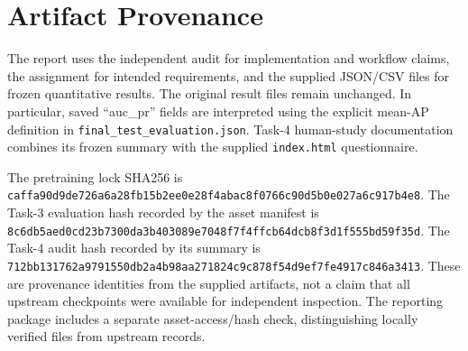 \documentclass[conference]{IEEEtran}
\begin{document}
\section{Artifact Provenance}\label{sec:provenance}
The report uses the independent audit for implementation and workflow claims, the assignment for intended requirements, and the supplied JSON/CSV files for frozen quantitative results. The original result files remain unchanged. In particular, saved ``auc\_pr'' fields are interpreted using the explicit mean-AP definition in \texttt{final\_test\_evaluation.json}. Task-4 human-study documentation combines its frozen summary with the supplied \texttt{index.html} questionnaire.

The pretraining lock SHA256 is \texttt{caffa90d9de726a6\allowbreak a28fb15b2ee0e28f\allowbreak 4abac8f0766c90d5\allowbreak b0e027a6c917b4e8}. The Task-3 evaluation hash recorded by the asset manifest is \texttt{8c6db5aed0cd23b7\allowbreak 300da3b403089e70\allowbreak 48f7f4ffcb64dcb8\allowbreak f3d1f555bd59f35d}. The Task-4 audit hash recorded by its summary is \texttt{712bb131762a9791\allowbreak 550db2a4b98aa271\allowbreak 824c9c878f54d9ef\allowbreak 7fe4917c846a3413}. These are provenance identities from the supplied artifacts, not a claim that all upstream checkpoints were available for independent inspection. The reporting package includes a separate asset-access/hash check, distinguishing locally verified files from upstream records.
\end{document}
